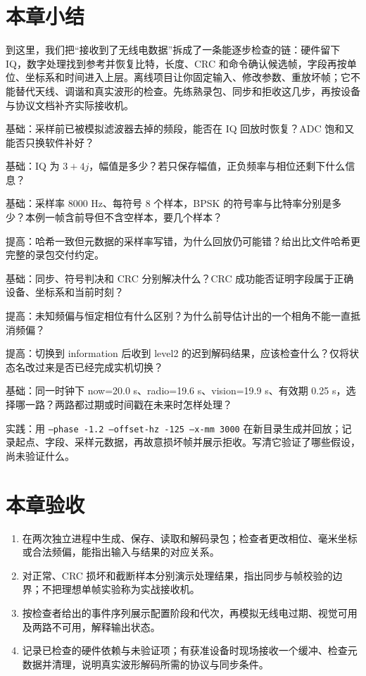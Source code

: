 \section{本章小结}
到这里，我们把“接收到了无线电数据”拆成了一条能逐步检查的链：硬件留下 IQ，数字处理找到参考并恢复比特，长度、CRC 和命令确认候选帧，字段再按单位、坐标系和时间进入上层。离线项目让你固定输入、修改参数、重放坏帧；它不能替代天线、调谐和真实波形的检查。先练熟录包、同步和拒收这几步，再按设备与协议文档补齐实际接收机。

\begin{problemset}
\renewcommand{\theenumi}{\arabic{enumi}}
\item\label{prob:v2-sdr-1} 基础：采样前已被模拟滤波器去掉的频段，能否在 IQ 回放时恢复？ADC 饱和又能否只换软件补好？
\item\label{prob:v2-sdr-2} 基础：IQ 为 $3+4j$，幅值是多少？若只保存幅值，正负频率与相位还剩下什么信息？
\item\label{prob:v2-sdr-3} 基础：采样率 8000 Hz、每符号 8 个样本，BPSK 的符号率与比特率分别是多少？本例一帧含前导但不含空样本，要几个样本？
\item\label{prob:v2-sdr-4} 提高：哈希一致但元数据的采样率写错，为什么回放仍可能错？给出比文件哈希更完整的录包交付约定。
\item\label{prob:v2-sdr-5} 基础：同步、符号判决和 CRC 分别解决什么？CRC 成功能否证明字段属于正确设备、坐标系和当前时刻？
\item\label{prob:v2-sdr-6} 提高：未知频偏与恒定相位有什么区别？为什么前导估计出的一个相角不能一直抵消频偏？
\item\label{prob:v2-sdr-7} 提高：切换到 information 后收到 level2 的迟到解码结果，应该检查什么？仅将状态名改过来是否已经完成实机切换？
\item\label{prob:v2-sdr-8} 基础：同一时钟下 now=20.0 s、radio=19.6 s、vision=19.9 s、有效期 0.25 s，选择哪一路？两路都过期或时间戳在未来时怎样处理？
\item\label{prob:v2-sdr-9} 实践：用 \texttt{--phase -1.2 --offset-hz -125 --x-mm 3000} 在新目录生成并回放；记录起点、字段、采样元数据，再故意损坏帧并展示拒收。写清它验证了哪些假设，尚未验证什么。
\end{problemset}

\section{本章验收}
\begin{enumerate}
\item 在两次独立进程中生成、保存、读取和解码录包；检查者更改相位、毫米坐标或合法频偏，能指出输入与结果的对应关系。
\item 对正常、CRC 损坏和截断样本分别演示处理结果，指出同步与帧校验的边界；不把理想单帧实验称为实战接收机。
\item 按检查者给出的事件序列展示配置阶段和代次，再模拟无线电过期、视觉可用及两路不可用，解释输出状态。
\item 记录已检查的硬件依赖与未验证项；有获准设备时现场接收一个缓冲、检查元数据并清理，说明真实波形解码所需的协议与同步条件。
\end{enumerate}
